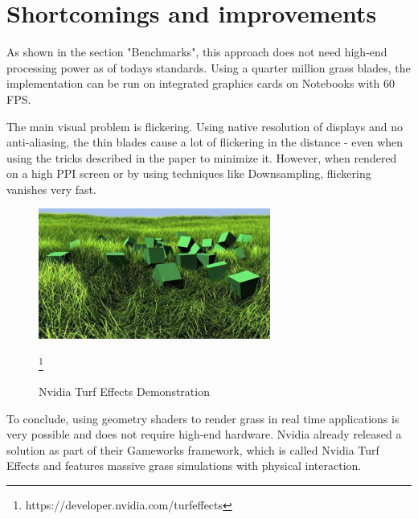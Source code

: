 \documentclass[conference]{acmsiggraph}
\begin{document}
\section{Shortcomings and improvements}

As shown in the section "Benchmarks", this approach does not need high-end processing power as of todays standards. Using a quarter million grass blades, the implementation can be run on integrated graphics cards on Notebooks with 60 FPS.

The main visual problem is flickering. Using native resolution of displays and no anti-aliasing, the thin blades cause a lot of flickering in the distance - even when using the tricks described in the paper to minimize it. However, when rendered on a high PPI screen or by using techniques like Downsampling, flickering vanishes very fast.

 \begin{figure}[ht]
   \centering
   \includegraphics[width=3.0in]{images/turf_effects}
   \caption{Nvidia Turf Effects Demonstration} \cite{NvidiaTurfEffects} \footnote{https://developer.nvidia.com/turfeffects}
 \end{figure}    

To conclude, using geometry shaders to render grass in real time applications is very possible and does not require high-end hardware. Nvidia already released a solution as part of their Gameworks framework, which is called Nvidia Turf Effects and features massive grass simulations with physical interaction.



\end{document}
